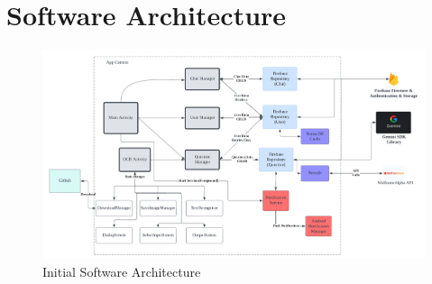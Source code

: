 \section{Software Architecture}\label{software_architecture}

\begin{figure}[h]
       \centering
       \includegraphics[width=\textwidth]{Figures/StudyTogether_Architecture.png}
       \caption{\footnotesize Initial Software Architecture}
       \label{StudyTogether_Architecture}
\end{figure}




